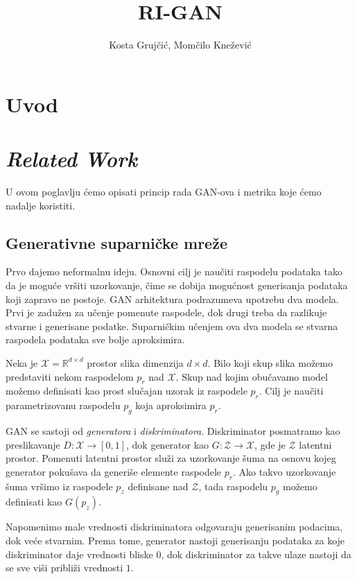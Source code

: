 \documentclass[12pt, a4paper]{article}
\begin{document}
\date{}
\title{RI-GAN}
\author{Kosta Grujčić, Momčilo Knežević}
\maketitle

\begin{abstract}
\end{abstract}

\section{Uvod}

\section{\textit{Related Work}}
U ovom poglavlju ćemo opisati princip rada GAN-ova i metrika koje ćemo nadalje koristiti.

\subsection{Generativne suparničke mreže}
	Prvo dajemo neformalnu ideju. Osnovni cilj je naučiti raspodelu podataka tako da je moguće vršiti uzorkovanje, čime se dobija mogućnost generisanja podataka koji zapravo ne postoje. GAN arhitektura podrazumeva upotrebu dva modela. Prvi je zadužen za učenje pomenute raspodele, dok drugi treba da razlikuje stvarne i generisane podatke. Suparničkim učenjem ova dva modela se stvarna raspodela podataka sve bolje aproksimira.
	
	Neka je $\mathcal{X}=\mathbb{R}^{d \times d}$ prostor slika dimenzija $d\times d$. Bilo koji skup slika možemo predstaviti nekom raspodelom $p_r$ nad $\mathcal{X}$. Skup nad kojim obučavamo model možemo definisati kao prost slučajan uzorak iz raspodele $p_r$. Cilj je naučiti parametrizovanu raspodelu $p_g$ koja aproksimira $p_r$.
	
	GAN se sastoji od \textit{generatora} i \textit{diskriminatora}. Diskriminator posmatramo kao preslikavanje $D: \mathcal{X} \rightarrow [0, 1]$, dok generator kao $G:\mathcal{Z} \rightarrow \mathcal{X}$, gde je $\mathcal{Z}$ latentni prostor. Pomenuti latentni prostor služi za uzorkovanje šuma na osnovu kojeg generator pokušava da generiše elemente raspodele $p_r$. Ako takvo uzorkovanje šuma vršimo iz raspodele $p_z$ definisane nad $\mathcal{Z}$, tada raspodelu $p_g$ možemo definisati kao $G(p_z)$.
	
	Napomenimo male vrednosti diskriminatora odgovaraju generisanim podacima, dok veće stvarnim. Prema tome, generator nastoji generisanju podataka za koje diskriminator daje vrednosti bliske $0$, dok diskriminator za takve ulaze nastoji da se sve viši približi vrednosti $1$.
	
\end{document}
